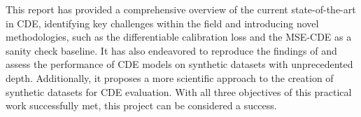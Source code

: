 \documentclass{article}
\begin{document}
This report has provided a comprehensive overview of the current state-of-the-art in CDE, identifying key challenges within the field and introducing novel methodologies, such as the differentiable calibration loss and the MSE-CDE as a sanity check baseline. It has also endeavored to reproduce the findings of \citep{rothfuss2019noise} and assess the performance of CDE models on synthetic datasets with unprecedented depth. Additionally, it proposes a more scientific approach to the creation of synthetic datasets for CDE evaluation. With all three objectives of this practical work successfully met, this project can be considered a success.


\end{document}
